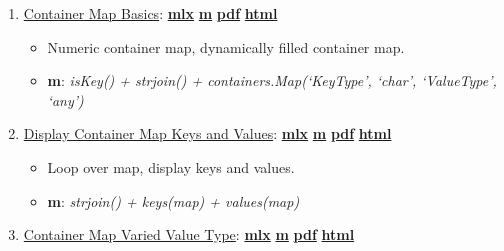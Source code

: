 \documentclass[
]{book}
\providecommand{\tightlist}{%
  \setlength{\itemsep}{0pt}\setlength{\parskip}{0pt}}
\begin{document}
\begin{enumerate}
\def\labelenumi{\arabic{enumi}.}
\tightlist
\item
  \href{https://fanwangecon.github.io/M4Econ/amto/container/htmlpdfm/fs_container.html}{Container Map Basics}: \href{https://github.com/FanWangEcon/M4Econ/blob/master/amto/container/fs_container.mlx}{\textbf{mlx}} \textbar{} \href{https://github.com/FanWangEcon/M4Econ/blob/master/amto/container/htmlpdfm/fs_container.m}{\textbf{m}} \textbar{} \href{https://github.com/FanWangEcon/M4Econ/blob/master/amto/container/htmlpdfm/fs_container.pdf}{\textbf{pdf}} \textbar{} \href{https://fanwangecon.github.io/M4Econ/amto/container/htmlpdfm/fs_container.html}{\textbf{html}}

  \begin{itemize}
  \tightlist
  \item
    Numeric container map, dynamically filled container map.
  \item
    \textbf{m}: \emph{isKey() + strjoin() + containers.Map(`KeyType', `char', `ValueType', `any')}
  \end{itemize}
\item
  \href{https://fanwangecon.github.io/M4Econ/amto/container/htmlpdfm/fs_containermap.html}{Display Container Map Keys and Values}: \href{https://github.com/FanWangEcon/M4Econ/blob/master/amto/container/fs_containermap.mlx}{\textbf{mlx}} \textbar{} \href{https://github.com/FanWangEcon/M4Econ/blob/master/amto/container/htmlpdfm/fs_containermap.m}{\textbf{m}} \textbar{} \href{https://github.com/FanWangEcon/M4Econ/blob/master/amto/container/htmlpdfm/fs_containermap.pdf}{\textbf{pdf}} \textbar{} \href{https://fanwangecon.github.io/M4Econ/amto/container/htmlpdfm/fs_containermap.html}{\textbf{html}}

  \begin{itemize}
  \tightlist
  \item
    Loop over map, display keys and values.
  \item
    \textbf{m}: \emph{strjoin() + keys(map) + values(map)}
  \end{itemize}
\item
  \href{https://fanwangecon.github.io/M4Econ/amto/container/htmlpdfm/fs_map_anytype.html}{Container Map Varied Value Type}: \href{https://github.com/FanWangEcon/M4Econ/blob/master/amto/container/fs_map_anytype.mlx}{\textbf{mlx}} \textbar{} \href{https://github.com/FanWangEcon/M4Econ/blob/master/amto/container/htmlpdfm/fs_map_anytype.m}{\textbf{m}} \textbar{} \href{https://github.com/FanWangEcon/M4Econ/blob/master/amto/container/htmlpdfm/fs_map_anytype.pdf}{\textbf{pdf}} \textbar{} \href{https://fanwangecon.github.io/M4Econ/amto/container/htmlpdfm/fs_map_anytype.html}{\textbf{html}}


\end{enumerate}
\end{document}
